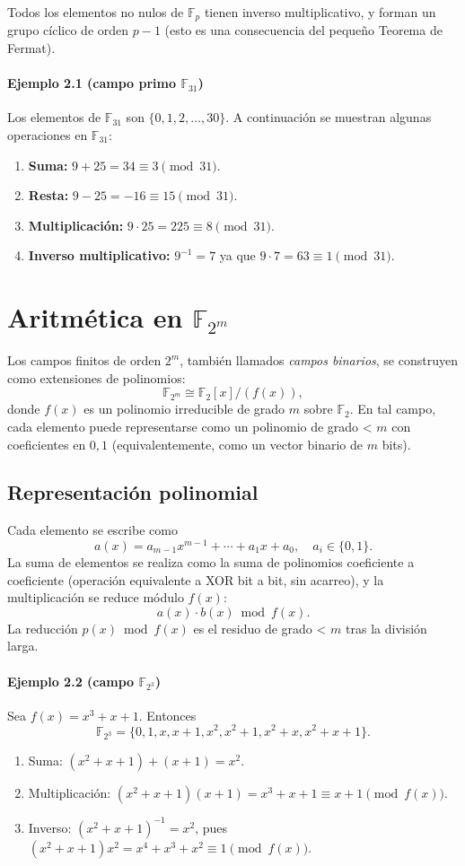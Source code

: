 Todos los elementos no nulos de $\mathbb{F}_p$ tienen inverso multiplicativo, y forman un grupo cíclico de orden $p-1$ (esto es una consecuencia del pequeño Teorema de Fermat).

\paragraph{Ejemplo 2.1 (campo primo $\mathbb{F}_{31}$)}  
Los elementos de $\mathbb{F}_{31}$ son $\{0,1,2,\dots,30\}$. A continuación se muestran algunas operaciones en $\mathbb{F}_{31}$:

\begin{enumerate}
  \item \textbf{Suma:} $9 + 25 = 34 \equiv 3 \pmod{31}.$
  \item \textbf{Resta:} $9 - 25 = -16 \equiv 15 \pmod{31}.$
  \item \textbf{Multiplicación:} $9 \cdot 25 = 225 \equiv 8 \pmod{31}.$
  \item \textbf{Inverso multiplicativo:} $9^{-1} = 7$ ya que $9 \cdot 7 = 63 \equiv 1 \pmod{31}.$
\end{enumerate}

\section{Aritmética en \texorpdfstring{$\mathbb{F}_{2^m}$}{F2m}}
Los campos finitos de orden $2^m$, también llamados \emph{campos binarios}, se construyen como extensiones de polinomios:
\[
  \mathbb{F}_{2^m}\cong\mathbb{F}_2[x]/(f(x)),
\]
donde $f(x)$ es un polinomio irreducible de grado $m$ sobre $\mathbb{F}_2$.
En tal campo, cada elemento puede representarse como un polinomio de grado < $m$ con coeficientes en ${0,1}$ (equivalentemente, como un vector binario de $m$ bits).

\subsection{Representación polinomial}
Cada elemento se escribe como
\[
  a(x)=a_{m-1}x^{m-1}+\cdots+a_1x+a_0,\quad a_i\in\{0,1\}.
\]
La suma de elementos se realiza como la suma de polinomios coeficiente a coeficiente (operación equivalente a XOR bit a bit, sin acarreo), y la multiplicación se reduce módulo $f(x)$:
\[
  a(x)\cdot b(x)\bmod f(x).
\]
La reducción $p(x)\bmod f(x)$ es el residuo de grado < $m$ tras la división larga.

\paragraph{Ejemplo 2.2 (campo $\mathbb{F}_{2^3}$)}
Sea $f(x)=x^3+x+1$. Entonces
\[
  \mathbb{F}_{2^3}=\{0,1,x,x+1,x^2,x^2+1,x^2+x,x^2+x+1\}.
\]
\begin{enumerate}
  \item Suma: $(x^2+x+1)+(x+1)=x^2$.
  \item Multiplicación: $(x^2+x+1)(x+1)=x^3+x+1\equiv x+1\pmod{f(x)}$.
  \item Inverso: $(x^2+x+1)^{-1}=x^2$, pues $(x^2+x+1)x^2=x^4+x^3+x^2\equiv1\pmod{f(x)}$.
\end{enumerate}

